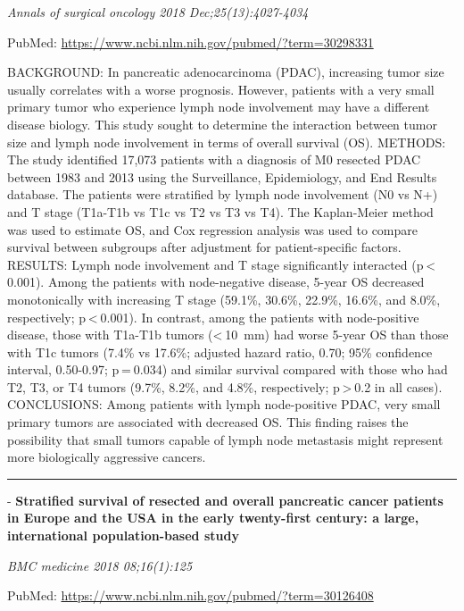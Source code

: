\documentclass[]{article}
\begin{document}
\emph{Annals of surgical oncology 2018 Dec;25(13):4027-4034}

PubMed: \url{https://www.ncbi.nlm.nih.gov/pubmed/?term=30298331}

BACKGROUND: In pancreatic adenocarcinoma (PDAC), increasing tumor size
usually correlates with a worse prognosis. However, patients with a very
small primary tumor who experience lymph node involvement may have a
different disease biology. This study sought to determine the
interaction between tumor size and lymph node involvement in terms of
overall survival (OS). METHODS: The study identified 17,073 patients
with a diagnosis of M0 resected PDAC between 1983 and 2013 using the
Surveillance, Epidemiology, and End Results database. The patients were
stratified by lymph node involvement (N0 vs N+) and T stage (T1a-T1b vs
T1c vs T2 vs T3 vs T4). The Kaplan-Meier method was used to estimate OS,
and Cox regression analysis was used to compare survival between
subgroups after adjustment for patient-specific factors. RESULTS: Lymph
node involvement and T stage significantly interacted
(p \textless{} 0.001). Among the patients with node-negative disease,
5-year OS decreased monotonically with increasing T stage (59.1\%,
30.6\%, 22.9\%, 16.6\%, and 8.0\%, respectively; p \textless{} 0.001).
In contrast, among the patients with node-positive disease, those with
T1a-T1b tumors (\textless{} 10~mm) had worse 5-year OS than those with
T1c tumors (7.4\% vs 17.6\%; adjusted hazard ratio, 0.70; 95\%
confidence interval, 0.50-0.97; p = 0.034) and similar survival compared
with those who had T2, T3, or T4 tumors (9.7\%, 8.2\%, and 4.8\%,
respectively; p \textgreater{} 0.2 in all cases). CONCLUSIONS: Among
patients with lymph node-positive PDAC, very small primary tumors are
associated with decreased OS. This finding raises the possibility that
small tumors capable of lymph node metastasis might represent more
biologically aggressive cancers.

{}

{}

\begin{center}\rule{0.5\linewidth}{\linethickness}\end{center}

 - \textbf{Stratified survival of resected and overall pancreatic cancer
patients in Europe and the USA in the early twenty-first century: a
large, international population-based study}

\emph{BMC medicine 2018 08;16(1):125}

PubMed: \url{https://www.ncbi.nlm.nih.gov/pubmed/?term=30126408}
\end{document}
